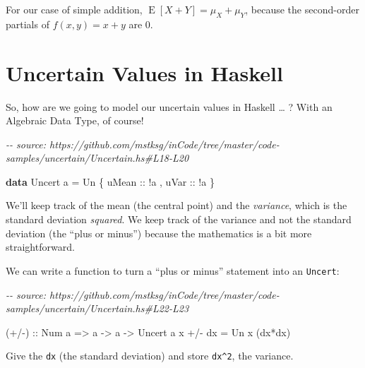 \documentclass[]{article}
\newenvironment{Shaded}{}{}
\newcommand{\CommentTok}[1]{\textcolor[rgb]{0.38,0.63,0.69}{\textit{#1}}}
\newcommand{\DataTypeTok}[1]{\textcolor[rgb]{0.56,0.13,0.00}{#1}}
\newcommand{\KeywordTok}[1]{\textcolor[rgb]{0.00,0.44,0.13}{\textbf{#1}}}
\newcommand{\NormalTok}[1]{#1}
\newcommand{\OperatorTok}[1]{\textcolor[rgb]{0.40,0.40,0.40}{#1}}
\newcommand{\OtherTok}[1]{\textcolor[rgb]{0.00,0.44,0.13}{#1}}
\begin{document}
For our case of simple addition, \(\operatorname{E}[X + Y] = \mu_X + \mu_Y\),
because the second-order partials of \(f(x,y) = x + y\) are 0.

\section{Uncertain Values in Haskell}\label{uncertain-values-in-haskell}

So, how are we going to model our uncertain values in Haskell \ldots{} ? With an
Algebraic Data Type, of course!

\begin{Shaded}
\begin{Highlighting}[]
\CommentTok{{-}{-} source: https://github.com/mstksg/inCode/tree/master/code{-}samples/uncertain/Uncertain.hs\#L18{-}L20}

\KeywordTok{data} \DataTypeTok{Uncert}\NormalTok{ a }\OtherTok{=} \DataTypeTok{Un}\NormalTok{ \{}\OtherTok{ uMean ::} \OperatorTok{!}\NormalTok{a}
\NormalTok{                   ,}\OtherTok{ uVar  ::} \OperatorTok{!}\NormalTok{a}
\NormalTok{                   \}}
\end{Highlighting}
\end{Shaded}

We'll keep track of the mean (the central point) and the \emph{variance}, which
is the standard deviation \emph{squared}. We keep track of the variance and not
the standard deviation (the ``plus or minus'') because the mathematics is a bit
more straightforward.

We can write a function to turn a ``plus or minus'' statement into an
\texttt{Uncert}:

\begin{Shaded}
\begin{Highlighting}[]
\CommentTok{{-}{-} source: https://github.com/mstksg/inCode/tree/master/code{-}samples/uncertain/Uncertain.hs\#L22{-}L23}

\OtherTok{(+/{-}) ::} \DataTypeTok{Num}\NormalTok{ a }\OtherTok{=\textgreater{}}\NormalTok{ a }\OtherTok{{-}\textgreater{}}\NormalTok{ a }\OtherTok{{-}\textgreater{}} \DataTypeTok{Uncert}\NormalTok{ a}
\NormalTok{x }\OperatorTok{+/{-}}\NormalTok{ dx }\OtherTok{=} \DataTypeTok{Un}\NormalTok{ x (dx}\OperatorTok{*}\NormalTok{dx)}
\end{Highlighting}
\end{Shaded}

Give the \texttt{dx} (the standard deviation) and store \texttt{dx\^{}2}, the
variance.
\end{document}
